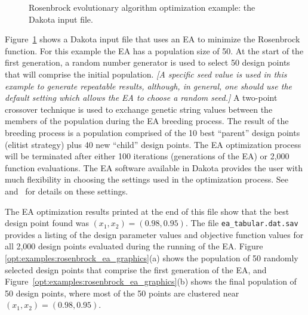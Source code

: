 \begin{figure}[ht!]
  \centering
  \begin{bigbox}
    \begin{small}
    \end{small}
  \end{bigbox}
  \caption{Rosenbrock evolutionary algorithm optimization example: the
  Dakota input file.}
  \label{opt:examples:rosenbrock_ea}
\end{figure}

Figure~\ref{opt:examples:rosenbrock_ea} shows a Dakota input file that
uses an EA to minimize the Rosenbrock function. For this
example the EA has a population size of 50. At the start of the first
generation, a random number generator is used to select 50 design
points that will comprise the initial population. \emph{[A specific
  seed value is used in this example to generate repeatable results,
  although, in general, one should use the default setting which
  allows the EA to choose a random seed.]} A two-point crossover
technique is used to exchange genetic string values between the
members of the population during the EA breeding process. The result
of the breeding process is a population comprised of the 10 best
``parent'' design points (elitist strategy) plus 40 new ``child''
design points. The EA optimization process will be terminated after
either 100 iterations (generations of the EA) or 2,000 function
evaluations. The EA software available in Dakota provides the user
with much flexibility in choosing the settings used in the
optimization process. See~\cite{RefMan} and~\cite{Har06} for details on these
settings.

The EA optimization results
printed at the end of this file show that the best design point found
was $(x_1,x_2) = (0.98,0.95)$. The file
\texttt{ea\_tabular.dat.sav} provides a listing of the design
parameter values and objective function values for all 2,000 design
points evaluated during the running of the EA. Figure~
\ref{opt:examples:rosenbrock_ea_graphics}(a) shows the population of
50 randomly selected design points that comprise the first generation
of the EA, and Figure~\ref{opt:examples:rosenbrock_ea_graphics}(b)
shows the final population of 50 design points, where most of the 50
points are clustered near $(x_1,x_2) = (0.98,0.95)$.

